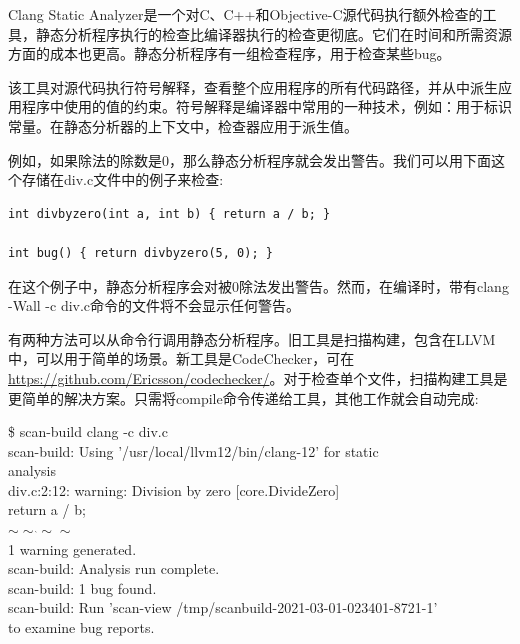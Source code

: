 Clang Static Analyzer是一个对C、C++和Objective-C源代码执行额外检查的工具，静态分析程序执行的检查比编译器执行的检查更彻底。它们在时间和所需资源方面的成本也更高。静态分析程序有一组检查程序，用于检查某些bug。\par

该工具对源代码执行符号解释，查看整个应用程序的所有代码路径，并从中派生应用程序中使用的值的约束。符号解释是编译器中常用的一种技术，例如：用于标识常量。在静态分析器的上下文中，检查器应用于派生值。\par

例如，如果除法的除数是0，那么静态分析程序就会发出警告。我们可以用下面这个存储在div.c文件中的例子来检查:\par

\begin{lstlisting}[caption={}]
int divbyzero(int a, int b) { return a / b; }

int bug() { return divbyzero(5, 0); }
\end{lstlisting}

在这个例子中，静态分析程序会对被0除法发出警告。然而，在编译时，带有clang -Wall -c div.c命令的文件将不会显示任何警告。\par

有两种方法可以从命令行调用静态分析程序。旧工具是扫描构建，包含在LLVM中，可以用于简单的场景。新工具是CodeChecker，可在\url{https://github.com/Ericsson/codechecker/}。对于检查单个文件，扫描构建工具是更简单的解决方案。只需将compile命令传递给工具，其他工作就会自动完成:\par

\begin{tcolorbox}[colback=white,colframe=black]
\$ scan-build clang -c div.c \\
scan-build: Using '/usr/local/llvm12/bin/clang-12' for static \\
analysis \\
div.c:2:12: warning: Division by zero [core.DivideZero] \\
\hspace*{0.5cm}return a / b; \\
\hspace*{1.3cm}$\sim\sim\hat{}\sim\sim$ \\
1 warning generated. \\
scan-build: Analysis run complete. \\
scan-build: 1 bug found. \\
scan-build: Run 'scan-view /tmp/scanbuild-2021-03-01-023401-8721-1' \\
to examine bug reports.
\end{tcolorbox}

